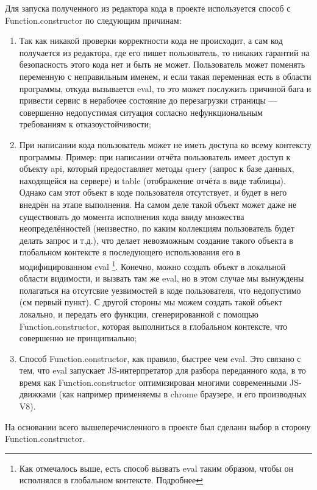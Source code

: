 \documentclass[12pt]{article}
\begin{document}
    Для запуска полученного из редактора кода в проекте используется способ с Function.constructor по следующим причинам:
    \begin{enumerate}
        \item Так как никакой проверки корректности кода не происходит, а сам код получается из редактора, где его пишет пользователь, то
        никаких гарантий на безопасность этого кода нет и быть не может. Пользователь может поменять переменную с неправильным именем, и если
        такая переменная есть в области программы, откуда вызывается eval, то это может послужить причиной бага и привести сервис в нерабочее состояние
        до перезагрузки страницы --- совершенно недопустимая ситуация согласно нефункциональным требованиям к отказоустойчивости;
        \item При написании кода пользователь может не иметь доступа ко всему контексту программы. Пример: при написании отчёта пользователь
        имеет доступ к объекту api, который предоставляет методы query (запрос к базе данных, находящейся на сервере) и table (отображение
        отчёта в виде таблицы). Однако сам этот объект в коде пользователя отсутствует, и будет в него внедрён на этапе выполнения. На самом деле
        такой объект может даже не существовать до момента исполнения кода ввиду множества неопределённостей (неизвестно, по каким коллекциям
        пользователь будет делать запрос и т.д.), что делает невозможным создание такого объекта в глобальном контексте я последующего использования его в модифицированном eval
        \footnote{Как отмечалось выше, есть способ вызвать eval таким образом, чтобы он исполнялся в глобальном контексте. Подробнее\cite{GlobalEval}}. Конечно, можно создать объект в локальной области видимости, и вызвать там же eval,
        но в этом случае мы вынуждены полагаться на отсутсвие уезвимостей в коде пользователя, что недопустимо (см первый пункт). С другой
        стороны мы можем создать такой объект локально, и передать его функции, сгенерированной с помощью Function.constructor, которая выполниться
        в глобальном контексте, что совершенно не принципиально;
        \item Способ Function.constructor, как правило, быстрее чем eval. Это связано с тем, что eval запускает JS-интерпретатор для разбора переданного кода, в то время как Function.constructor оптимизирован многими современными JS-движками
        (как например применяемы в chrome браузере, и его производных V8).
    \end{enumerate}
    На основании всего вышеперечисленного в проекте был сделанн выбор в сторону Function.constructor.
\end{document}
